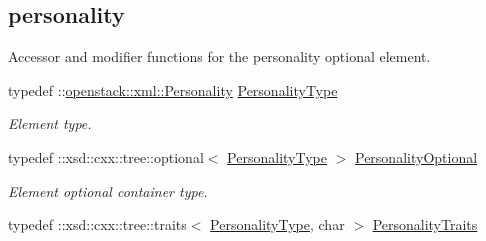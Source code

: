 \subsection*{personality}
\label{_amgrp389c96dcef754f01bc2d49a8007c4a3f}
Accessor and modifier functions for the personality optional element. \begin{DoxyCompactItemize}
\item 
\hypertarget{classopenstack_1_1xml_1_1Server_a3dc9dfa2c5633975160e1b7962638089}{
typedef ::\hyperlink{classopenstack_1_1xml_1_1Personality}{openstack::xml::Personality} \hyperlink{classopenstack_1_1xml_1_1Server_a3dc9dfa2c5633975160e1b7962638089}{PersonalityType}}
\label{classopenstack_1_1xml_1_1Server_a3dc9dfa2c5633975160e1b7962638089}

\begin{DoxyCompactList}\small\item\em Element type. \item\end{DoxyCompactList}\item 
\hypertarget{classopenstack_1_1xml_1_1Server_a97f24d21c989cec16adbfafabc729f2b}{
typedef ::xsd::cxx::tree::optional$<$ \hyperlink{classopenstack_1_1xml_1_1Personality}{PersonalityType} $>$ \hyperlink{classopenstack_1_1xml_1_1Server_a97f24d21c989cec16adbfafabc729f2b}{PersonalityOptional}}
\label{classopenstack_1_1xml_1_1Server_a97f24d21c989cec16adbfafabc729f2b}

\begin{DoxyCompactList}\small\item\em Element optional container type. \item\end{DoxyCompactList}\item 
\hypertarget{classopenstack_1_1xml_1_1Server_acdc5bb2856c116b65ecdabba13b81ed3}{
typedef ::xsd::cxx::tree::traits$<$ \hyperlink{classopenstack_1_1xml_1_1Personality}{PersonalityType}, char $>$ \hyperlink{classopenstack_1_1xml_1_1Server_acdc5bb2856c116b65ecdabba13b81ed3}{PersonalityTraits}}
\label{classopenstack_1_1xml_1_1Server_acdc5bb2856c116b65ecdabba13b81ed3}


\end{DoxyCompactItemize}
